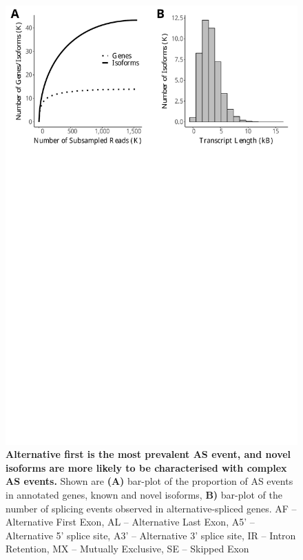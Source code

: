 \vspace{1cm}
\begin{figure}[!h]
	\begin{center}
		\includegraphics[page=5,trim={0 26cm 0 0},clip,scale = 0.55]{Figures/IsoSeqWholeTranscriptome.pdf}
	\end{center}
	\captionsetup{width=0.95\textwidth}
	\caption[Alternative splicing events from transcriptome profiling of the mouse cortex]%
	{\textbf{Alternative first is the most prevalent AS event, and novel isoforms are more likely to be characterised with complex AS events.} Shown are \textbf{(A)} bar-plot of the proportion of AS events in annotated genes, known and novel isoforms, \textbf{B)} bar-plot of the number of splicing events observed in alternative-spliced genes. AF – Alternative First Exon, AL – Alternative Last Exon, A5’ – Alternative 5’ splice site, A3’ – Alternative 3’ splice site, IR – Intron Retention, MX – Mutually Exclusive, SE – Skipped Exon}
	\label{fig:isoseq_whole_As_events}
\end{figure}


